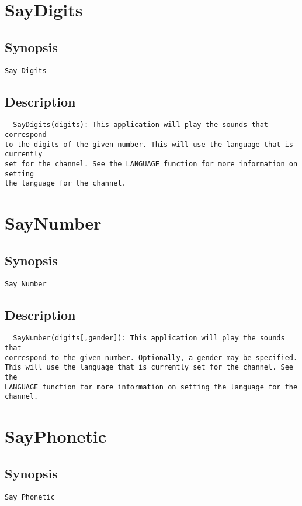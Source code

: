 \section{SayDigits}
\subsection{Synopsis}
\begin{verbatim}
Say Digits
\end{verbatim}
\subsection{Description}
\begin{verbatim}
  SayDigits(digits): This application will play the sounds that correspond
to the digits of the given number. This will use the language that is currently
set for the channel. See the LANGUAGE function for more information on setting
the language for the channel.

\end{verbatim}


\section{SayNumber}
\subsection{Synopsis}
\begin{verbatim}
Say Number
\end{verbatim}
\subsection{Description}
\begin{verbatim}
  SayNumber(digits[,gender]): This application will play the sounds that
correspond to the given number. Optionally, a gender may be specified.
This will use the language that is currently set for the channel. See the
LANGUAGE function for more information on setting the language for the channel.

\end{verbatim}


\section{SayPhonetic}
\subsection{Synopsis}
\begin{verbatim}
Say Phonetic
\end{verbatim}
